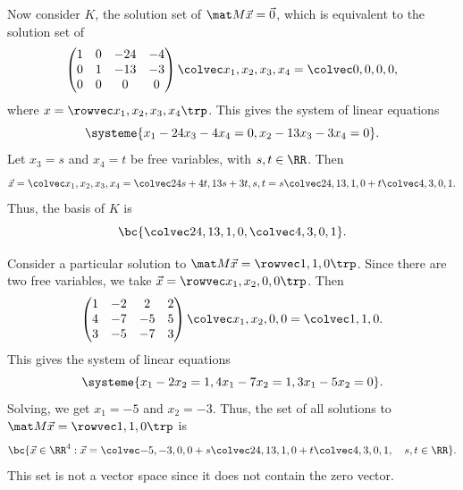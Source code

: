 \begin{solution}
\begin{ppart}
        Now consider $K$, the solution set of $\mat M \vec x = \vec 0$, which is equivalent to the solution set of \[\begin{pmatrix}1 & 0 & -24 & -4 \\ 0 & 1 & -13 & -3 \\ 0 & 0 & 0 & 0\end{pmatrix} \cveciv{x_1}{x_2}{x_3}{x_4} = \cveciv0000,\] where $x = \cvecivx{x_1}{x_2}{x_3}{x_4}$. This gives the system of linear equations \[\systeme{x_1 - 24 x_3 - 4 x_4 = 0, x_2 - 13 x_3 - 3x_4 = 0}.\] Let $x_3 = s$ and $x_4 = t$ be free variables, with $s, t \in \RR$. Then \[\vec x = \cveciv{x_1}{x_2}{x_3}{x_4} = \cveciv{24s + 4t}{13s + 3t}{s}{t} = s\cveciv{24}{13}{1}{0} + t\cveciv4301.\] Thus, the basis of $K$ is \[\bc{\cveciv{24}{13}{1}{0}, \cveciv4301}.\]
    \end{ppart}
    \begin{ppart}
        Consider a particular solution to $\mat M \vec x = \cveciiix110$. Since there are two free variables, we take $\vec x = \cvecivx{x_1}{x_2}00$. Then \[\begin{pmatrix}1 & -2 & 2 & 2 \\ 4 & -7 & -5 & 5 \\ 3 & -5 & -7 & 3\end{pmatrix}\cveciv{x_1}{x_2}00 = \cveciii110.\] This gives the system of linear equations \[\systeme{x_1 - 2x_2 = 1, 4x_1 - 7x_2 = 1, 3x_1 - 5x_2 = 0}.\] Solving, we get $x_1 = -5$ and $x_2 = -3$. Thus, the set of all solutions to $\mat M \vec x = \cveciiix110$ is \[\bc{\vec x \in \RR^4: \vec x = \cveciv{-5}{-3}00 + s\cveciv{24}{13}{1}{0} + t\cveciv4301, \quad s, t \in \RR}.\] This set is not a vector space since it does not contain the zero vector.
    \end{ppart}
\end{solution}

